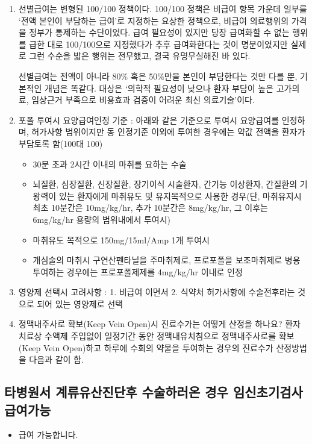 {\begin{enumerate}\tightlist
\item 선별급여는 변형된 100/100 정책이다. 100/100 정책은 비급여 항목 가운데 일부를 `전액 본인이 부담하는 급여’로 지정하는 요상한 정책으로, 비급여 의료행위의 가격을 정부가 통제하는 수단이었다. 급여 필요성이 있지만 당장 급여화할 수 없는 행위를 급한 대로 100/100으로 지정했다가 추후 급여화한다는 것이 명분이었지만 실제로 그런 수순을 밟은 행위는 전무했고, 결국 유명무실해진 바 있다.\par
선별급여는 전액이 아니라 80\% 혹은 50\%만을 본인이 부담한다는 것만 다를 뿐, 기본적인 개념은 똑같다. 대상은 `의학적 필요성이 낮으나 환자 부담이 높은 고가의료, 임상근거 부족으로 비용효과 검증이 어려운 최신 의료기술’이다.\par
\item 포폴 투여시 요양급여인정 기준 : 아래와 같은 기준으로 투여시 요양급여를 인정하며, 허가사항 범위이지만 동 인정기준 이외에 투여한 경우에는 약값 전액을 환자가 부담토록 함(100대 100)
	\begin{itemize}[o]\tightlist
	\item 30분 초과 2시간 이내의 마취를 요하는 수술
	\item 뇌질환, 심장질환, 신장질환, 장기이식 시술환자, 간기능 이상환자, 간질환의 기왕력이 있는 환자에게 마취유도 및 유지목적으로 사용한 경우(단, 마취유지시 최초 10분간은 10mg/kg/hr, 추가 10분간은 8mg/kg/hr, 그 이후는 6mg/kg/hr 용량의 범위내에서 투여시)
	\item 마취유도 목적으로 150mg/15ml/Amp 1개 투여시
	\item 개심술의 마취시 구연산펜타닐을 주마취제로, 프로포폴을 보조마취제로 병용투여하는 경우에는 프로포폴제제를 4mg/kg/hr 이내로 인정
	\end{itemize}
\item 영양제 선택시 고려사항 :  1. 비급여 이면서 2. 식약처 허가사항에 수술전후라는 것으로 되어 있는 영양제로 선택
\item 정맥내주사로 확보(Keep Vein Open)시 진료수가는 어떻게 산정을 하나요? 환자 치료상 수액제 주입없이 일정기간 동안 정맥내유치침으로 정맥내주사로를 확보(Keep Vein Open)하고 하루에 수회의 약물을 투여하는 경우의 진료수가 산정방법을 다음과 같이 함.
\end{enumerate}}
\prezi{\clearpage}

\subsection{타병원서 계류유산진단후 수술하러온 경우 임신초기검사 급여가능}
\begin{itemize}\tightlist
\item 급여 가능합니다. 
\end{itemize}
\prezi{\clearpage}
